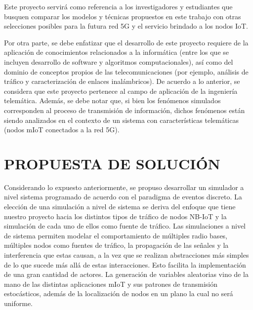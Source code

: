 Este proyecto servirá como referencia a los investigadores y estudiantes que busquen comparar los modelos y técnicas propuestos en este trabajo con otras selecciones posibles para la futura red 5G y el servicio brindado a los nodos IoT.\newline

Por otra parte, se debe enfatizar que el desarrollo de este proyecto requiere de la aplicación de conocimientos relacionados a la informática (entre los que se incluyen desarrollo de software y algoritmos computacionales), así como del dominio de conceptos propios de las telecomunicaciones (por ejemplo, análisis de tráfico y caracterización de enlaces inalámbricos). De acuerdo a lo anterior, se considera que este proyecto pertenece al campo de aplicación de la ingeniería telemática. Además, se debe notar que, si bien los fenómenos simulados corresponden al proceso de transmisión de información, dichos fenómenos están siendo analizados en el contexto de un sistema con características telemáticas (nodos mIoT conectados a la red 5G).\newline


\section{PROPUESTA DE SOLUCIÓN}

Considerando lo expuesto anteriormente, se propuso desarrollar un simulador a nivel sistema programado de acuerdo con el paradigma de eventos discreto. La elección de una simulación a nivel de sistema se deriva del enfoque que tiene nuestro proyecto hacia los distintos tipos de tráfico de nodos NB-IoT y la simulación de cada uno de ellos como fuente de tráfico. Las simulaciones a nivel de sistema permiten modelar el comportamiento de múltiples radio bases, múltiples nodos como fuentes de tráfico, la propagación de las señales y la interferencia que estas causan, a la vez que se realizan abstracciones más simples de lo que sucede más allá de estas interacciones. Esto facilita la implementación de una gran cantidad de actores. La generación de variables aleatorias vino de la mano de las distintas aplicaciones mIoT y sus patrones de transmisión estocásticos, además de la localización de  nodos en un plano la cual no será uniforme.\newline

